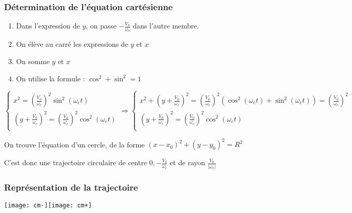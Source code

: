 \documentclass[french]{yLectureNote}
\begin{document}
\subsubsection{Détermination de l'équation cartésienne}
\begin{enumerate}
 \item Dans l'expression de $y$, on passe $-\frac{V_0}{\omega_c }$ dans l'autre membre.
 \item On élève au carré les expressions de $y$ et $x$
 \item On somme $y$ et $x$
 \item On utilise la formule : $\cos^2+\sin^2 = 1$
\end{enumerate}
\[
 \left\{\begin{matrix}
 x^2 = (\frac{V_0}{\omega_c})^2\sin^2(\omega_c t)  \\
 (y+\frac{V_0}{\omega_c })^2 = (\frac{V_0}{\omega_c })^2 \cos^2(\omega_c t)\\
\end{matrix}\right.
\Rightarrow
 \left\{\begin{matrix}
 x^2 + (y+\frac{V_0}{\omega_c })^2 = (\frac{V_0}{\omega_c})^2(\cos^2(\omega_c t)+\sin^2(\omega_c t)) =  (\frac{V_0}{\omega_c})^2\\
 (y+\frac{V_0}{\omega_c })^2 = (\frac{V_0}{\omega_c })^2 \cos^2(\omega_c t)\\
\end{matrix}\right.
\]

On trouve l'équation d'un cercle, de la forme $(x-x_0)^2+(y-y_0)^2 = R^2$

C'est donc une trajectoire circulaire de centre $0, -\frac{V_0}{\omega_c}$ et de rayon $\frac{V_0}{|\omega_c|}$

\subsubsection{Représentation de la trajectoire}

\texttt{[image: cm-]}\texttt{[image: cm+]}
\end{document}
